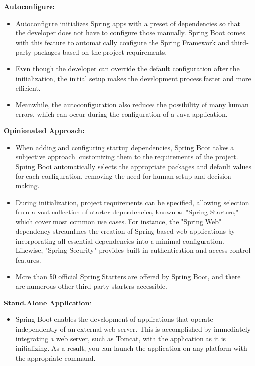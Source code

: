    \textbf{Autoconfigure:}
        \begin{itemize}
            \item Autoconfigure initializes Spring apps with a preset of dependencies so that the developer does not have to configure those manually. Spring Boot comes with this feature to automatically configure the Spring Framework and third-party packages based on the project requirements.
            \item Even though the developer can override the default configuration after the initialization, the initial setup makes the development process faster and more efficient.
            \item Meanwhile, the autoconfiguration also reduces the possibility of many human errors, which can occur during the configuration of a Java application.
        \end{itemize}
    \textbf{Opinionated Approach:}
        \begin{itemize}
            \item When adding and configuring startup dependencies, Spring Boot takes a subjective approach, customizing them to the requirements of the project. Spring Boot automatically selects the appropriate packages and default values for each configuration, removing the need for human setup and decision-making.

            \item During initialization, project requirements can be specified, allowing selection from a vast collection of starter dependencies, known as "Spring Starters," which cover most common use cases. For instance, the "Spring Web" dependency streamlines the creation of Spring-based web applications by incorporating all essential dependencies into a minimal configuration. Likewise, "Spring Security" provides built-in authentication and access control features. 

            \item More than 50 official Spring Starters are offered by Spring Boot, and there are numerous other third-party starters accessible.


        \end{itemize}
    \textbf{Stand-Alone Application:}
        \begin{itemize}
            \item Spring Boot enables the development of applications that operate independently of an external web server. This is accomplished by immediately integrating a web server, such as Tomcat, with the application as it is initializing. As a result, you can launch the application on any platform with the appropriate command.
        \end{itemize}      
        \Autocite{Andi:SpringBoot1, Andi:SpringBoot2}          
    
